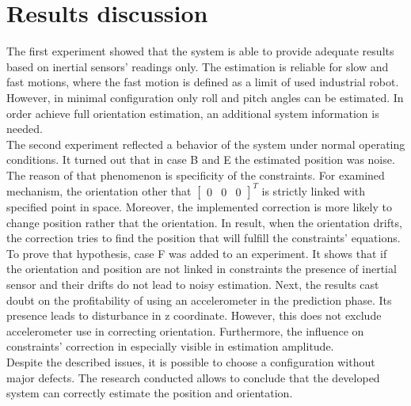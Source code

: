 \section{Results discussion}

The first experiment showed that the system is able to provide adequate results based on inertial sensors' readings only. The estimation is reliable for slow and fast motions, where the fast motion is defined as a limit of used industrial robot. However, in minimal configuration only roll and pitch angles can be estimated. In order achieve full orientation estimation, an additional system information is needed.\\

The second experiment reflected a behavior of the system under normal operating conditions. It turned out that in case B and E the estimated position was noise. The reason of that phenomenon is specificity of the constraints. For examined mechanism, the orientation other that $\begin{bmatrix}0 & 0 & 0 \end{bmatrix}^T$ is strictly linked with specified point in space. Moreover, the implemented correction is more likely to change position rather that the orientation. In result, when the orientation drifts, the correction tries to find the position that will fulfill the constraints' equations. To prove that hypothesis, case F was added to an experiment. It shows that if the orientation and position are not linked in constraints the presence of inertial sensor and their drifts do not lead to noisy estimation. Next, the results cast doubt on the profitability of using an accelerometer in the prediction phase. Its presence leads to disturbance in z coordinate. However, this does not exclude accelerometer use in correcting orientation. Furthermore, the influence on constraints' correction in especially visible in estimation amplitude. \\

  
Despite the described issues, it is possible to choose a configuration without major defects.
The research conducted allows to conclude that the developed system can correctly estimate the position and orientation. 



